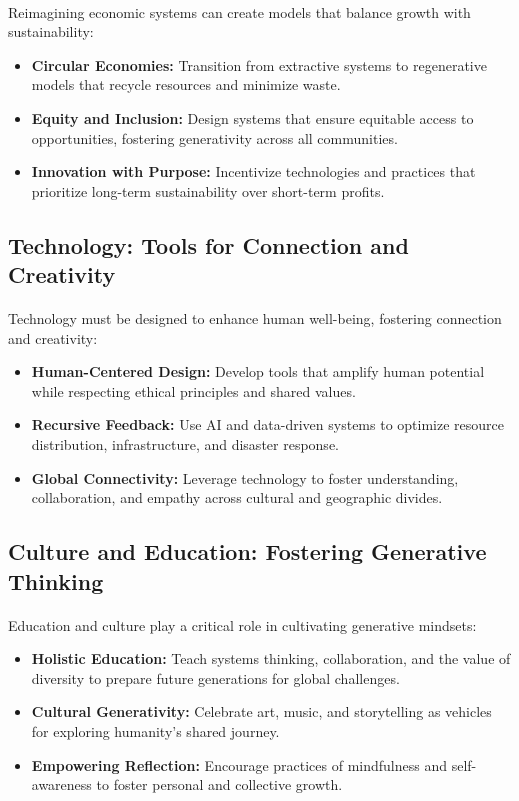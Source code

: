 \documentclass[12pt]{article}
\begin{document}
\paragraph{}
Reimagining economic systems can create models that balance growth with sustainability:
\begin{itemize}
    \item \textbf{Circular Economies:} Transition from extractive systems to regenerative models that recycle resources and minimize waste.
    \item \textbf{Equity and Inclusion:} Design systems that ensure equitable access to opportunities, fostering generativity across all communities.
    \item \textbf{Innovation with Purpose:} Incentivize technologies and practices that prioritize long-term sustainability over short-term profits.
\end{itemize}

\subsection{Technology: Tools for Connection and Creativity}
\paragraph{}
Technology must be designed to enhance human well-being, fostering connection and creativity:
\begin{itemize}
    \item \textbf{Human-Centered Design:} Develop tools that amplify human potential while respecting ethical principles and shared values.
    \item \textbf{Recursive Feedback:} Use AI and data-driven systems to optimize resource distribution, infrastructure, and disaster response.
    \item \textbf{Global Connectivity:} Leverage technology to foster understanding, collaboration, and empathy across cultural and geographic divides.
\end{itemize}

\subsection{Culture and Education: Fostering Generative Thinking}
\paragraph{}
Education and culture play a critical role in cultivating generative mindsets:
\begin{itemize}
    \item \textbf{Holistic Education:} Teach systems thinking, collaboration, and the value of diversity to prepare future generations for global challenges.
    \item \textbf{Cultural Generativity:} Celebrate art, music, and storytelling as vehicles for exploring humanity’s shared journey.
    \item \textbf{Empowering Reflection:} Encourage practices of mindfulness and self-awareness to foster personal and collective growth.
\end{itemize}
\end{document}
